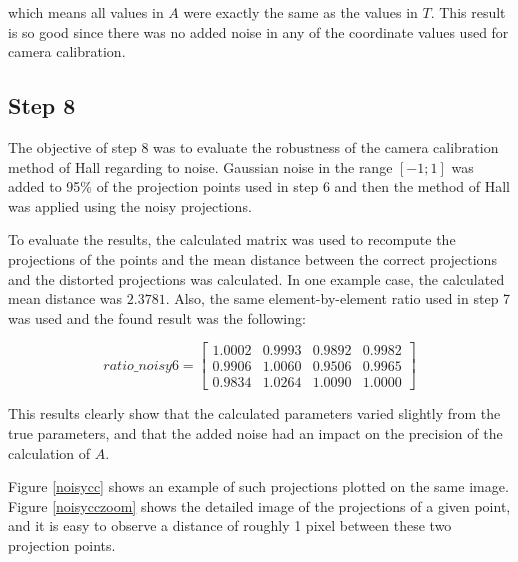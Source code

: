 \documentclass[journal]{IEEEtran}
\begin{document}
which means all values in $A$ were exactly the same as the values in $T$. This result is so good since there was no added noise in any of the coordinate values used for camera calibration.

\subsection{Step 8}

The objective of step 8 was to evaluate the robustness of the camera calibration method of Hall regarding to noise. Gaussian noise in the range $[-1;1]$ was added to 95\% of the projection points used in step 6 and then the method of Hall was applied using the noisy projections.

To evaluate the results, the calculated matrix was used to recompute the projections of the points and the mean distance between the correct projections and the distorted projections was calculated. In one example case, the calculated mean distance was $2.3781$. Also, the same element-by-element ratio used in step 7 was used and the found result was the following:

\[
ratio\_noisy6 = 
\begin{bmatrix}
    1.0002  &  0.9993  &  0.9892  &  0.9982 \\
    0.9906  &  1.0060  &  0.9506  &  0.9965 \\
    0.9834  &  1.0264  &  1.0090  &  1.0000 
\end{bmatrix}
\]

This results clearly show that the calculated parameters varied slightly from the true parameters, and that the added noise had an impact on the precision of the calculation of $A$.

Figure \ref{noisycc} shows  an example of such projections plotted on the same image. Figure \ref{noisycczoom} shows the detailed image of the projections of a given point, and it is easy to observe a distance of roughly 1 pixel between these two projection points.
\end{document}
